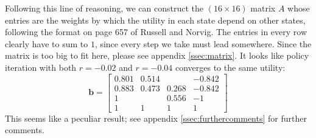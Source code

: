 \documentclass[letterpaper, 10pt]{article}
\begin{document}
\begin{multicols}{2}
Following this line of reasoning, we can construct the $(16 \times 16)$ matrix $A$ whose entries are the weights by which the utility in each state depend on other states, following the format on page 657 of Russell and Norvig.
The entries in every row clearly have to sum to $1$, since every step we take must lead somewhere. 
Since the matrix is too big to fit here, please see appendix \ref{ssec:matrix}. 
It looks like policy iteration with both $r = -0.02$ and $r = -0.04$ converges to the same utility:
\[
\mathbf{b} = 
\begin{bmatrix}
	0.801 & 0.514 &       & -0.842 \\
	0.883 & 0.473 & 0.268 & -0.842 \\
	1     &       & 0.556 & -1     \\
	1     & 1     & 1     &  1
\end{bmatrix}
\]
This seems like a peculiar result; see appendix \ref{ssec:furthercomments} for further comments.

% 


\end{multicols}
\end{document}

